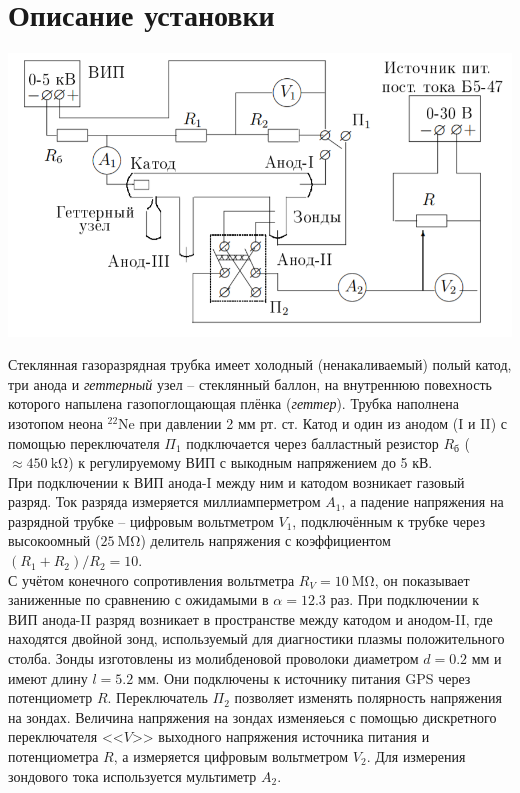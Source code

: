\documentclass[12pt, a4paper]{article}
\begin{document}
\section*{Описание установки}
\begin{center}
\includegraphics[scale=0.6]{pics/1.png}
\end{center}
Стеклянная газоразрядная трубка имеет холодный (ненакаливаемый) полый катод, три анода и \textit{геттерный} узел -- стеклянный баллон, на внутреннюю повехность которого напылена газопоглощающая плёнка (\textit{геттер}). Трубка наполнена изотопом неона $^22$Ne при давлении 2 мм рт. ст. Катод и один из анодом (I и II) с помощью переключателя $\Pi_1$ подключается через балластный резистор $R_\text{б}$ ($\approx 450~\mathrm{k\Omega}$) к регулируемому ВИП с выкодным напряжением до 5 кВ.\\
При подключении к ВИП анода-I между ним и катодом возникает газовый разряд. Ток разряда измеряется миллиамперметром $A_1$, а падение напряжения на разрядной трубке -- цифровым вольтметром $V_1$, подключённым к трубке через высокоомный ($25~\mathrm{M\Omega}$) делитель напряжения с коэффициентом $(R_1+R_2)/R_2 = 10$.\\
С учётом конечного сопротивления вольтметра $R_V = 10~\mathrm{M\Omega}$, он показывает заниженные по сравнению с ожидамыми в $\alpha = 12.3$ раз.
При подключении к ВИП анода-II разряд возникает в пространстве между катодом и анодом-II, где находятся двойной зонд, используемый для диагностики плазмы положительного столба. Зонды изготовлены из молибденовой проволоки диаметром $d = 0.2$ мм и имеют длину $l = 5.2$ мм. Они подключены к источнику питания GPS через потенциометр $R$. Переключатель $\Pi_2$ позволяет изменять полярность напряжения на зондах. Величина напряжения на зондах изменяеься с помощью дискретного переключателя <<$V$>> выходного напряжения источника питания и потенциометра $R$, а измеряется цифровым вольтметром $V_2$. Для измерения зондового тока используется мультиметр $A_2$.
\end{document}
